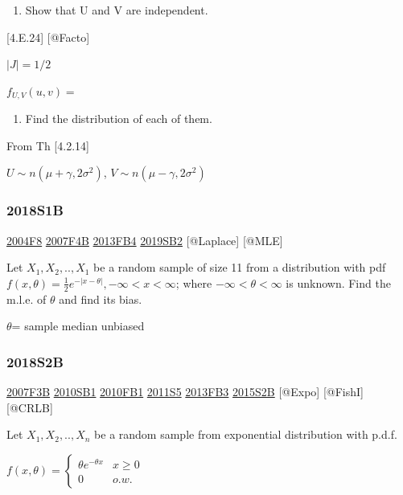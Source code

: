 \documentclass[6pt,twocolumn,Portrait]{article}
\providecommand{\tightlist}{%
  \setlength{\itemsep}{0pt}\setlength{\parskip}{0pt}}
\begin{document}
\begin{enumerate}
\def\labelenumi{(\alph{enumi})}
\tightlist
\item
  Show that U and V are independent.
\end{enumerate}

{[}4.E.24{]} {[}@Facto{]}

\(|J|=1/2\)

\(f_{U,V}(u,v)=\)

\begin{enumerate}
\def\labelenumi{(\alph{enumi})}
\setcounter{enumi}{1}
\tightlist
\item
  Find the distribution of each of them.
\end{enumerate}

From Th {[}4.2.14{]}

\(U\sim n(\mu+\gamma,2\sigma^2)\), \(V\sim n(\mu-\gamma,2\sigma^2)\)

\hypertarget{s1b-2}{%
\subsubsection{2018S1B}\label{s1b-2}}

\protect\hyperlink{f8-2}{2004F8} \protect\hyperlink{f4b}{2007F4B}
\protect\hyperlink{fb4-2}{2013FB4} \protect\hyperlink{sb2-3}{2019SB2}
{[}@Laplace{]} {[}@MLE{]}

Let \(X_1,X_2,..,X_1\) be a random sample of size 11 from a distribution
with pdf \(f(x,\theta) =\frac12e^{-|x-\theta|}, -\infty<x<\infty\);
where \(-\infty<\theta<\infty\) is unknown. Find the m.l.e. of
\(\theta\) and find its bias.

\(\theta\)= sample median unbiased

\hypertarget{s2b-2}{%
\subsubsection{2018S2B}\label{s2b-2}}

\protect\hyperlink{f3b}{2007F3B} \protect\hyperlink{sb1-1}{2010SB1}
\protect\hyperlink{fb1-1}{2010FB1} \protect\hyperlink{s5-2}{2011S5}
\protect\hyperlink{fb3-2}{2013FB3} \protect\hyperlink{s2b-1}{2015S2B}
{[}@Expo{]} {[}@FishI{]} {[}@CRLB{]}

Let \(X_1,X_2,..,X_n\) be a random sample from exponential distribution
with p.d.f.

\(f(x,\theta)=\begin{cases}\theta e^{-\theta x}& x\ge0\\0& o.w.\end{cases}\)
\end{document}
